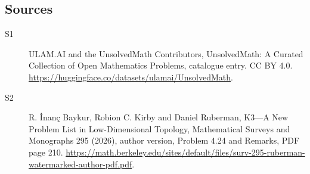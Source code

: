 \documentclass[11pt]{article}
\begin{document}
\subsection{Sources}
\begin{description}
\item[\hypertarget{source:statement:1}{S1}] ULAM.AI and the UnsolvedMath Contributors, UnsolvedMath: A Curated Collection of Open Mathematics Problems, catalogue entry. CC BY 4.0. \url{https://huggingface.co/datasets/ulamai/UnsolvedMath}.
\item[\hypertarget{source:statement:2}{S2}] R. İnanç Baykur, Robion C. Kirby and Daniel Ruberman, K3—A New Problem List in Low-Dimensional Topology, Mathematical Surveys and Monographs 295 (2026), author version, Problem 4.24 and Remarks, PDF page 210. \url{https://math.berkeley.edu/sites/default/files/surv-295-ruberman-watermarked-author-pdf.pdf}.
\end{description}
\label{end:statement}
\end{document}

